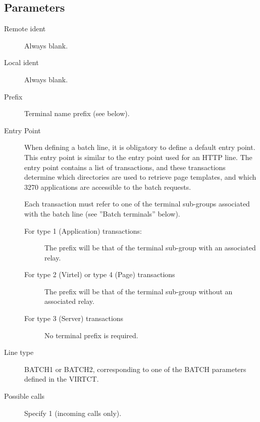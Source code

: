 \documentclass[letterpaper,10pt,english]{sphinxmanual}
\begin{document}

\ignorespaces 

\subsection{Parameters}
\label{\detokenize{connectivity_guide:index-32}}\label{\detokenize{connectivity_guide:id10}}\begin{description}
\item[{Remote ident}] \leavevmode
Always blank.

\item[{Local ident}] \leavevmode
Always blank.

\item[{Prefix}] \leavevmode
Terminal name prefix (see below).

\item[{Entry Point}] \leavevmode
When defining a batch line, it is obligatory to define a default entry point. This entry point is similar to the entry point used for an HTTP line. The entry point contains a list of transactions, and these transactions determine which directories are used to retrieve page templates, and which 3270 applications are accessible to the batch requests.

Each transaction must refer to one of the terminal sub-groups associated with the batch line (see ”Batch terminals” below).
\begin{description}
\item[{For type 1 (Application) transactions:}] \leavevmode
The prefix will be that of the terminal sub-group with an associated relay.

\item[{For type 2 (Virtel) or type 4 (Page) transactions}] \leavevmode
The prefix will be that of the terminal sub-group without an associated relay.

\item[{For type 3 (Server) transactions}] \leavevmode
No terminal prefix is required.

\end{description}

\item[{Line type}] \leavevmode
BATCH1 or BATCH2, corresponding to one of the BATCH parameters defined in the VIRTCT.

\item[{Possible calls}] \leavevmode
Specify 1 (incoming calls only).


\end{description}
\end{document}
